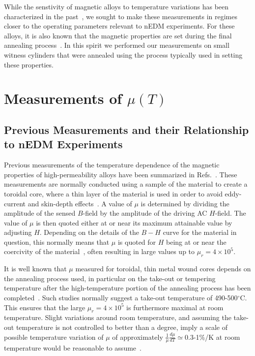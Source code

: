 \documentclass[review]{elsarticle}
\begin{document}
While the senstivity of magnetic alloys to temperature variations has
been characterized in the past~\cite{bib:couderchon,bib:kruppvdm}, we
sought to make these measurements in regimes closer to the operating
parameters relevant to nEDM experiments.  For these alloys, it is also
known that the magnetic properties are set during the final annealing
process~\cite{bib:gupta,bib:bozorth,bib:kruppvdm}.  In this spirit we
performed our measurements on small witness cylinders that were
annealed using the process typically used in setting these properties.








\section{Measurements of $\mu(T)$}

\subsection{Previous Measurements and their Relationship to nEDM Experiments\label{sec:previousmeasurement}}

Previous measurements of the temperature dependence of the magnetic
properties of high-permeability alloys have been summarized in
Refs.~\cite{bib:pfeifer,bib:bozorth,bib:couderchon}.  These
measurements are normally conducted using a sample of the material to
create a toroidal core, where a thin layer of the material is used in
order to avoid eddy-current and skin-depth
effects~\cite{bib:pfeifer,bib:kruppvdm}.  A value of $\mu$ is
determined by dividing the amplitude of the sensed $B$-field by the
amplitude of the driving AC $H$-field.  The value of $\mu$ is then
quoted either at or near its maximum attainable value by adjusting
$H$.  Depending on the details of the $B-H$ curve for the material in
question, this normally means that $\mu$ is quoted for $H$ being at or
near the coercivity of the
material~\cite{bib:couderchon,bib:kruppvdm}, often resulting in large
values up to $\mu_r=4\times 10^5$.

It is well known that $\mu$ measured for toroidal, thin metal wound
cores depends on the annealing process used, in particular on the
take-out or tempering temperature after the high-temperature portion
of the annealing process has been
completed~\cite{bib:pfeifer,bib:kruppvdm,bib:couderchon}.  Such
studies normally suggest a take-out temperature of 490-500$^\circ$C.
This ensures that the large $\mu_r=4\times 10^{5}$ is furthermore
maximal at room temperature.  Slight variations around room
temperature, and assuming the take-out temperature is not controlled
to better than a degree, imply a scale of possible temperature
variation of $\mu$ of approximately
$\frac{1}{\mu}\frac{d\mu}{dT}\simeq$0.3-1\%/K at room temperature would be
reasonable to assume~\cite{bib:couderchon,bib:kruppvdm}.
\end{document}
